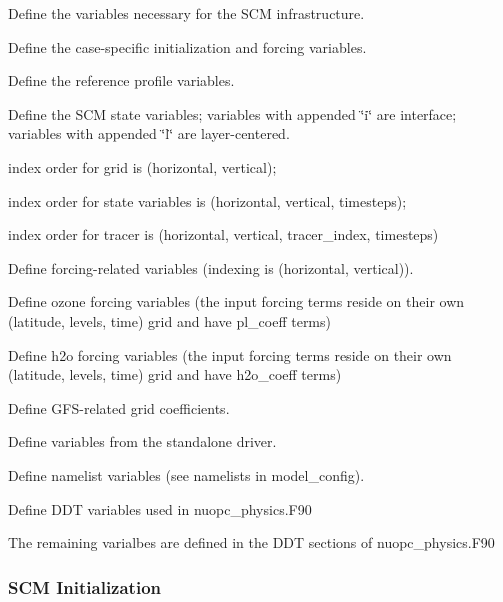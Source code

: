 \begin{DoxyItemize}
\item Define the variables necessary for the S\+CM infrastructure.
\item Define the case-\/specific initialization and forcing variables.
\item Define the reference profile variables.
\item Define the S\+CM state variables; variables with appended \char`\"{}i\char`\"{} are interface; variables with appended \char`\"{}l\char`\"{} are layer-\/centered.
\begin{DoxyItemize}
\item index order for grid is (horizontal, vertical);
\item index order for state variables is (horizontal, vertical, timesteps);
\item index order for tracer is (horizontal, vertical, tracer\+\_\+index, timesteps)
\end{DoxyItemize}
\item Define forcing-\/related variables (indexing is (horizontal, vertical)).
\item Define ozone forcing variables (the input forcing terms reside on their own (latitude, levels, time) grid and have \textquotesingle{}pl\+\_\+coeff\textquotesingle{} terms)
\item Define h2o forcing variables (the input forcing terms reside on their own (latitude, levels, time) grid and have \textquotesingle{}h2o\+\_\+coeff\textquotesingle{} terms)
\item Define G\+F\+S-\/related grid coefficients.
\item Define variables from the standalone driver.
\begin{DoxyItemize}
\item Define namelist variables (see namelists in model\+\_\+config).
\item Define D\+DT variables used in nuopc\+\_\+physics.\+F90
\item The remaining varialbes are defined in the D\+DT sections of nuopc\+\_\+physics.\+F90
\end{DoxyItemize}
\end{DoxyItemize}\hypertarget{group___s_c_m_init}{}\subsubsection{S\+C\+M Initialization}\label{group___s_c_m_init}

